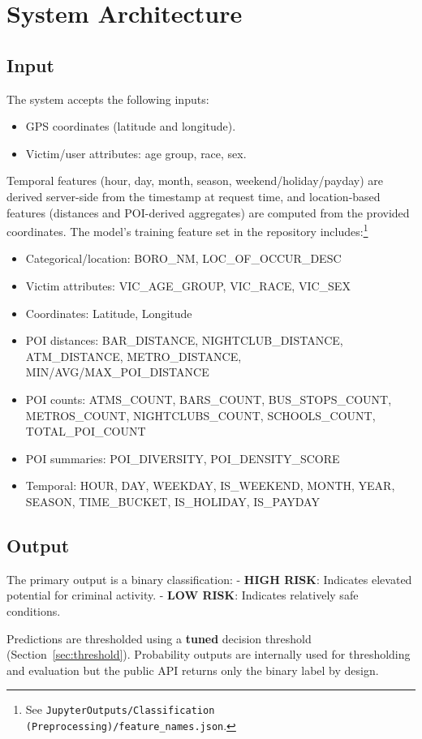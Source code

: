\documentclass{article}
\begin{document}
\section{System Architecture}

\subsection{Input}
The system accepts the following inputs:
\begin{itemize}
\item GPS coordinates (latitude and longitude).
\item Victim/user attributes: age group, race, sex.
\end{itemize}
Temporal features (hour, day, month, season, weekend/holiday/payday) are derived server-side from the timestamp at request time, and location-based features (distances and POI-derived aggregates) are computed from the provided coordinates. The model's training feature set in the repository includes:\footnote{See \texttt{JupyterOutputs/Classification (Preprocessing)/feature\_names.json}.}
\begin{itemize}
	\item Categorical/location: BORO\_NM, LOC\_OF\_OCCUR\_DESC
	\item Victim attributes: VIC\_AGE\_GROUP, VIC\_RACE, VIC\_SEX
	\item Coordinates: Latitude, Longitude
	\item POI distances: BAR\_DISTANCE, NIGHTCLUB\_DISTANCE, ATM\_DISTANCE, METRO\_DISTANCE, MIN/AVG/MAX\_POI\_DISTANCE
	\item POI counts: ATMS\_COUNT, BARS\_COUNT, BUS\_STOPS\_COUNT, METROS\_COUNT, NIGHTCLUBS\_COUNT, SCHOOLS\_COUNT, TOTAL\_POI\_COUNT
	\item POI summaries: POI\_DIVERSITY, POI\_DENSITY\_SCORE
	\item Temporal: HOUR, DAY, WEEKDAY, IS\_WEEKEND, MONTH, YEAR, SEASON, TIME\_BUCKET, IS\_HOLIDAY, IS\_PAYDAY
\end{itemize}

\subsection{Output}
The primary output is a binary classification:
- \textbf{HIGH RISK}: Indicates elevated potential for criminal activity.
- \textbf{LOW RISK}: Indicates relatively safe conditions.

Predictions are thresholded using a \textbf{tuned} decision threshold (Section~\ref{sec:threshold}). Probability outputs are internally used for thresholding and evaluation but the public API returns only the binary label by design.
\end{document}
